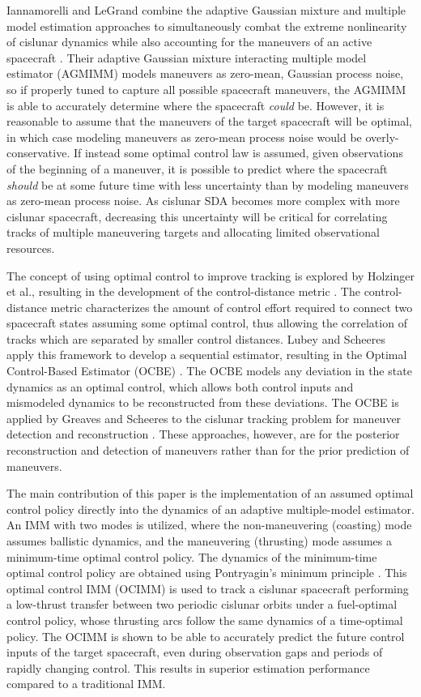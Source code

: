 \documentclass[letterpaper, preprint, paper,11pt]{AAS}	%
\begin{document}
Iannamorelli and LeGrand combine the adaptive Gaussian mixture and multiple model estimation approaches to simultaneously combat the extreme nonlinearity of cislunar dynamics while also accounting for the maneuvers of an active spacecraft \cite{iannamorelli2025adaptive}. Their adaptive Gaussian mixture interacting multiple model estimator (AGMIMM) models maneuvers as zero-mean, Gaussian process noise, so if properly tuned to capture all possible spacecraft maneuvers, the AGMIMM is able to accurately determine where the spacecraft \textit{could} be. However, it is reasonable to assume that the maneuvers of the target spacecraft will be optimal, in which case modeling maneuvers as zero-mean process noise would be overly-conservative. If instead some optimal control law is assumed, given observations of the beginning of a maneuver, it is possible to predict where the spacecraft \textit{should} be at some future time with less uncertainty than by modeling maneuvers as zero-mean process noise. As cislunar SDA becomes more complex with more cislunar spacecraft, decreasing this uncertainty will be critical for correlating tracks of multiple maneuvering targets and allocating limited observational resources.

The concept of using optimal control to improve tracking is explored by Holzinger et al., resulting in the development of the control-distance metric \cite{holzinger2012object}. The control-distance metric characterizes the amount of control effort required to connect two spacecraft states assuming some optimal control, thus allowing the correlation of tracks which are separated by smaller control distances. Lubey and Scheeres apply this framework to develop a sequential estimator, resulting in the Optimal Control-Based Estimator (OCBE) \cite{lubey2013optimal}. The OCBE models any deviation in the state dynamics as an optimal control, which allows both control inputs and mismodeled dynamics to be reconstructed from these deviations. The OCBE is applied by Greaves and Scheeres to the cislunar tracking problem for maneuver detection and reconstruction \cite{greaves2021observation}. These approaches, however, are for the posterior reconstruction and detection of maneuvers rather than for the prior prediction of maneuvers. 

The main contribution of this paper is the implementation of an assumed optimal control policy directly into the dynamics of an adaptive multiple-model estimator. An IMM with two modes is utilized, where the non-maneuvering (coasting) mode assumes ballistic dynamics, and the maneuvering (thrusting) mode assumes a minimum-time optimal control policy. The dynamics of the minimum-time optimal control policy are obtained using Pontryagin's minimum principle \cite{pontryagin1962}. This optimal control IMM (OCIMM) is used to track a cislunar spacecraft performing a low-thrust transfer between two periodic cislunar orbits under a fuel-optimal control policy, whose thrusting arcs follow the same dynamics of a time-optimal policy. The OCIMM is shown to be able to accurately predict the future control inputs of the target spacecraft, even during observation gaps and periods of rapidly changing control. This results in superior estimation performance compared to a traditional IMM. 
\end{document}
